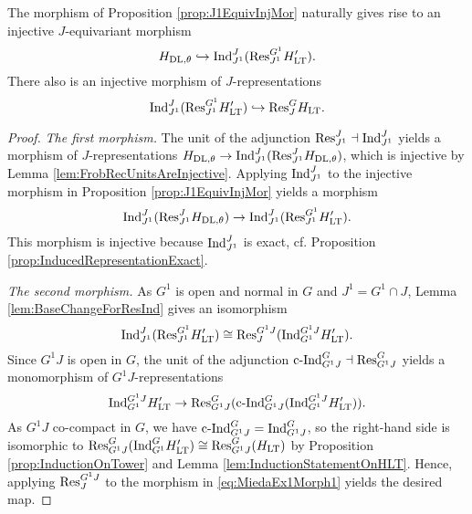 \documentclass[../main.tex]{subfiles}
\begin{document}
\begin{lem} \label{lem:JEquivInjMor}
  The morphism of Proposition \ref{prop:J1EquivInjMor} naturally gives rise to
  an injective $J$-equivariant morphism
  \begin{equation*}
    H_{\mathrm{DL},\theta} \hookrightarrow \mathrm{Ind}_{J^1}^J (\mathrm{Res}_{J^1}^{G^1} H'_{\mathrm{LT}}).
  \end{equation*}
  There also is an injective morphism of $J$-representations
  \begin{equation*}
     \mathrm{Ind}_{J^1}^J (\mathrm{Res}_{J^1}^{G^1} H'_{\mathrm{LT}}) \hookrightarrow \mathrm{Res}_J^G H_{\mathrm{LT}}.
  \end{equation*}
\begin{proof}
  \textit{The first morphism.}
  The unit of the adjunction $\mathrm{Res}_{J^1}^J \dashv \mathrm{Ind}_{J^1}^J$ yields a
  morphism of $J$-representations $H_{\mathrm{DL},\theta} \to \mathrm{Ind}_{J^1}^J(\mathrm{Res}_{J^1}^{J}
  H_{\mathrm{DL}, \theta})$, which is injective by Lemma \ref{lem:FrobRecUnitsAreInjective}.
  Applying $\mathrm{Ind}_{J^1}^J$ to the injective morphism in Proposition
  \ref{prop:J1EquivInjMor} yields a morphism
  \begin{equation*}
    \mathrm{Ind}_{J^1}^J ( \mathrm{Res}_{J^1}^J H_{\mathrm{DL},\theta} ) \to  \mathrm{Ind}_{J^1}^J
    (\mathrm{Res}_{J^1}^{G^1} H'_{\mathrm{LT}}).
  \end{equation*}
  This morphism is injective because $\mathrm{Ind}_{J^1}^J$ is exact, cf. Proposition
  \ref{prop:InducedRepresentationExact}. 

  \textit{The second morphism.} 
  As $G^1$ is open and normal in $G$ and $J^1 = G^1 \cap J$, 
  Lemma \ref{lem:BaseChangeForResInd} gives an isomorphism
  \begin{equation*}
    \mathrm{Ind}_{J^1}^J( \mathrm{Res}_{J^1}^{G^1} H'_{\mathrm{LT}}) \cong \mathrm{Res}_J^{G^1J}(
    \mathrm{Ind}_{G^1}^{G^1J} H'_{\mathrm{LT}}).
  \end{equation*}
  Since $G^1J$ is open in $G$, the unit of the adjunction $\mathrm{c\text{-}Ind}_{G^1J}^G \dashv
  \mathrm{Res}_{G^1J}^G$ yields a monomorphism of $G^1J$-representations 
  \begin{equation}\label{eq:MiedaEx1Morph1}
    \mathrm{Ind}_{G^1}^{G^1J} H_{\mathrm{LT}}' \to \mathrm{Res}_{G^1J}^G
    (\mathrm{c\text{-}Ind}_{G^1J}^G(\mathrm{Ind}_{G^1}^{G^1J} H'_{\mathrm{LT}})).
  \end{equation}
  As $G^1J$ co-compact in $G$, we have $\mathrm{c\text{-}Ind}_{G^1J}^G =
  \mathrm{Ind}_{G^1J}^G$, so the right-hand
  side is isomorphic to $\mathrm{Res}_{G^1J}^G(\mathrm{Ind}_{G^1}^G H'_{\mathrm{LT}}) \cong
  \mathrm{Res}_{G^1J}^G(H_{\mathrm{LT}})$ by Proposition \ref{prop:InductionOnTower} and 
  Lemma \ref{lem:InductionStatementOnHLT}. Hence, applying $\mathrm{Res}_J^{G^1J}$ to the
  morphism in \eqref{eq:MiedaEx1Morph1} yields the desired map.
\end{proof}
\end{lem}
\end{document}

